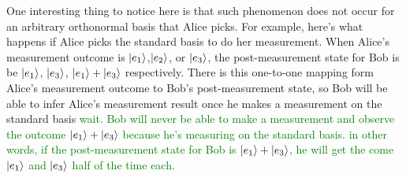 \begin{example}
One interesting thing to notice here is that such phenomenon does not occur for an arbitrary orthonormal basis that Alice picks. For example, here's what happens if Alice picks the standard basis to do her measurement. When Alice's measurement outcome is $\ket{e_1}$,$\ket{e_2}$, or $\ket{e_3}$, the post-measurement state for Bob is be $\ket{e_1}$, $\ket{e_3}$, $\ket{e_1}+\ket{e_3}$ respectively. There is this one-to-one mapping form Alice's measurement outcome to Bob's post-measurement state, so Bob will be able to infer Alice's measurement result once he makes a measurement on the standard basis 
\textcolor{green}{wait. Bob will never be able to make a measurement and observe the outcome $\ket{e_1}+\ket{e_3}$ because he's measuring on the standard basis. in other words, if the post-measurement state for Bob is $\ket{e_1}+\ket{e_3}$, he will get the come $\ket{e_1}$ and $\ket{e_3}$ half of the time each.}



\end{example}
